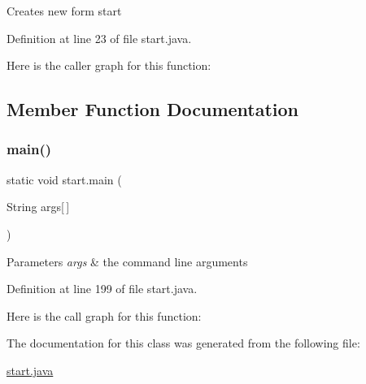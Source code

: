 Creates new form start 

Definition at line 23 of file start.\+java.

Here is the caller graph for this function\+:


\subsection{Member Function Documentation}
\mbox{\label{classstart_a1277ff280e269ebddba6a242cc43bd27}} 
\subsubsection{\texorpdfstring{main()}{main()}}
{\footnotesize\ttfamily static void start.\+main (\begin{DoxyParamCaption}\item[{String}]{args\mbox{[}$\,$\mbox{]} }\end{DoxyParamCaption})\hspace{0.3cm}{\ttfamily [static]}}


\begin{DoxyParams}{Parameters}
{\em args} & the command line arguments \\
\hline
\end{DoxyParams}


Definition at line 199 of file start.\+java.

Here is the call graph for this function\+:


The documentation for this class was generated from the following file\+:\begin{DoxyCompactItemize}
\item 
\mbox{\hyperlink{start_8java}{start.\+java}}\end{DoxyCompactItemize}
